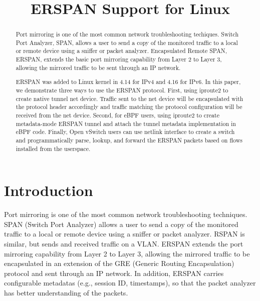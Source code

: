 \documentclass[10pt]{sigplanconf}
\begin{document}
\title{ERSPAN Support for Linux}
{}{}

\maketitle

\begin{abstract}
Port mirroring is one of the most common network troubleshooting techiques.
Switch Port Analyzer, SPAN, allows a user to send a copy of the monitored traffic
to a local or remote device using a sniffer or packet analyzer.
Encapsulated Remote SPAN, ERSPAN, extends the basic port mirroring capability
from Layer 2 to Layer 3, allowing the mirrored traffic to be sent through an IP network. 

ERSPAN was added to Linux kernel in 4.14 for IPv4 and 4.16 for IPv6.
In this paper, we demonstrate three ways to use the ERSPAN protocol.
First, using iproute2 to create native tunnel net device.
Traffic sent to the net device will be encapsulated with the protocol header
accordingly and traffic matching the protocol configuration will be received
from the net device.  Second, for eBPF users, using iproute2 to create metadata-mode
ERSPAN tunnel and attach the tunnel metadata implementation in eBPF code.
Finally, Open vSwitch users can use netlink interface to create a switch
and programmatically parse, lookup, and forward the ERSPAN packets based on flows
installed from the userspace.

\end{abstract}

\section{Introduction}\label{introduction}
Port mirroring is one of the most common network troubleshooting techniques.
SPAN (Switch Port Analyzer) allows a user to send a copy of the monitored traffic
to a local or remote device using a sniffer or packet analyzer.
RSPAN is similar, but sends and received traffic on a VLAN. ERSPAN extends the
port mirroring capability from Layer 2 to Layer 3, allowing the mirrored traffic
to be encapsulated in an extension of the GRE (Generic Routing Encapsulation) protocol
and sent through an IP network.  In addition, ERSPAN carries configurable metadatas
(e.g., session ID, timestamps), so that the packet analyzer has better understanding
of the packets.
\end{document}
